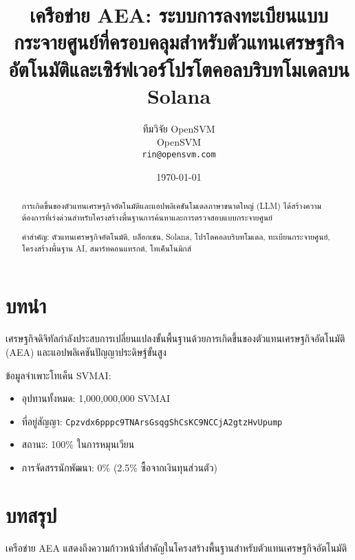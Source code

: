\documentclass[12pt,a4paper]{article}
\title{เครือข่าย AEA: ระบบการลงทะเบียนแบบกระจายศูนย์ที่ครอบคลุมสำหรับตัวแทนเศรษฐกิจอัตโนมัติและเซิร์ฟเวอร์โปรโตคอลบริบทโมเดลบน Solana}
\author{ทีมวิจัย OpenSVM \\ OpenSVM \\ \texttt{rin@opensvm.com}}
\date{\today}
\begin{document}
\maketitle

\begin{abstract}
การเกิดขึ้นของตัวแทนเศรษฐกิจอัตโนมัติและแอปพลิเคชันโมเดลภาษาขนาดใหญ่ (LLM) ได้สร้างความต้องการที่เร่งด่วนสำหรับโครงสร้างพื้นฐานการค้นหาและการตรวจสอบแบบกระจายศูนย์

คำสำคัญ: ตัวแทนเศรษฐกิจอัตโนมัติ, บล็อกเชน, Solana, โปรโตคอลบริบทโมเดล, ทะเบียนกระจายศูนย์, โครงสร้างพื้นฐาน AI, สมาร์ทคอนแทรกต์, โทเค็นโนมิกส์
\end{abstract}

\section{บทนำ}
เศรษฐกิจดิจิทัลกำลังประสบการเปลี่ยนแปลงขั้นพื้นฐานด้วยการเกิดขึ้นของตัวแทนเศรษฐกิจอัตโนมัติ (AEA) และแอปพลิเคชันปัญญาประดิษฐ์ขั้นสูง

ข้อมูลจำเพาะโทเค็น SVMAI:
\begin{itemize}
\item อุปทานทั้งหมด: 1,000,000,000 SVMAI
\item ที่อยู่สัญญา: \texttt{Cpzvdx6pppc9TNArsGsqgShCsKC9NCCjA2gtzHvUpump}
\item สถานะ: 100\% ในการหมุนเวียน
\item การจัดสรรนักพัฒนา: 0\% (2.5\% ซื้อจากเงินทุนส่วนตัว)
\end{itemize}

\section{บทสรุป}
เครือข่าย AEA แสดงถึงความก้าวหน้าที่สำคัญในโครงสร้างพื้นฐานสำหรับตัวแทนเศรษฐกิจอัตโนมัติ
\end{document}
